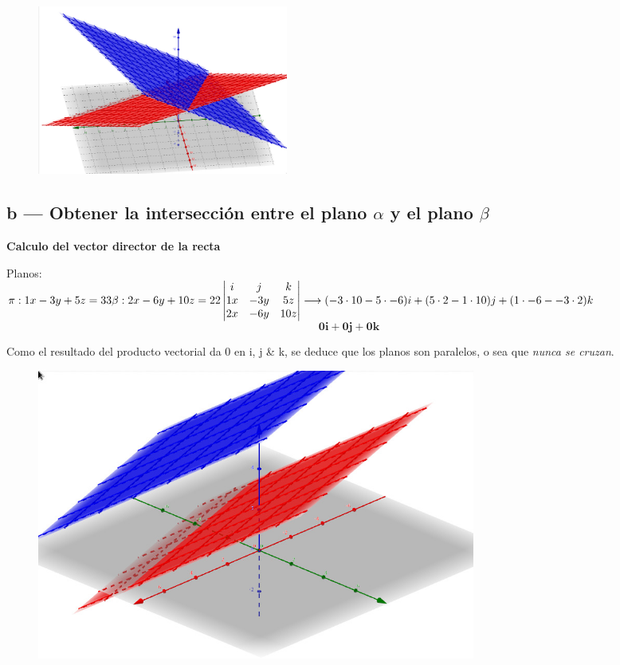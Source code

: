 \documentclass{article}
\newcommand{\x}{\cdot}
\begin{document}
			\begin{figure}[H]
				\centering
				\includegraphics[width=0.4\textwidth]{grafico1.jpg}
			\end{figure}
			\newpage

	\subsection{b --- Obtener la intersección entre el plano $\alpha$ y el plano $\beta$}
		\begin{center} \textbf{Calculo del vector director de la recta} \end{center}
			Planos: \\
			$
			\pi	: 1x - 3y + 5z = 33 \\
			\beta	: 2x -6y +10z = 22 \\\\
			\begin{vmatrix}
				i & j & k\\
				1x &-3y &5z\\
				2x &-6y &10z\\
			\end{vmatrix}
			\longrightarrow (-3\x10 - 5\x-6)i + (5\x2 - 1\x10)j + (1\x-6 - -3\x2)k
			$
			\[\boldsymbol{0i + 0j + 0k} \]

			Como el resultado del producto vectorial da 0 en i, j \& k, se deduce que los planos son paralelos, o sea que \emph{nunca se cruzan}. 
			\begin{figure}[H]
				\centering
				\includegraphics[width=0.7\textwidth]{grafico2.jpg}
			\end{figure}
\end{document}
